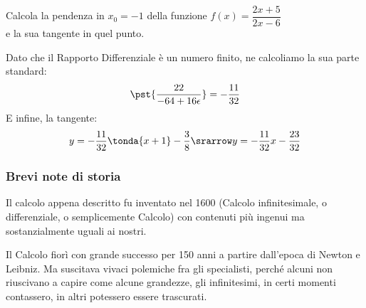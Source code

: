 \begin{esempio}
Calcola la pendenza in \(x_0 = -1\) della funzione 
\(f(x)=\dfrac{2x +5}{2x -6}\) \\
e la sua tangente in quel punto.

Dato che il Rapporto Differenziale è un numero finito, ne calcoliamo la 
sua parte standard:
\[\pst{\dfrac{22}{-64 +16 \epsilon}} = -\dfrac{11}{32}\]
E infine, la tangente:
\[y = -\dfrac{11}{32} \tonda{x +1} - \dfrac{3}{8} \srarrow 
  y = -\dfrac{11}{32} x -\dfrac{23}{32}\]
\end{esempio}

\subsubsection{Brevi note di storia}
Il calcolo appena descritto fu inventato nel 1600 (Calcolo infinitesimale, o 
differenziale, o semplicemente Calcolo) con contenuti più ingenui ma 
sostanzialmente uguali ai nostri. 


Il Calcolo fiorì con grande successo per 150 anni a partire 
dall'epoca di Newton e Leibniz. 
Ma suscitava vivaci polemiche fra gli specialisti, perché 
alcuni non riuscivano a capire come alcune grandezze, gli infinitesimi, 
in certi momenti contassero, in altri potessero essere trascurati.

